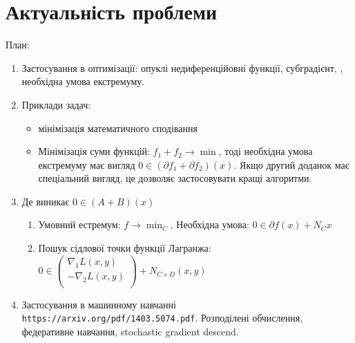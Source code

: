 \documentclass[main.tex]{subfile}
\begin{document}
	\section{Актуальність проблеми}
	 План:
	 \begin{enumerate}
	 	\item Застосування в оптимізації: опуклі недиференційовні функції, субградієнт, , необхідна умова екстремуму.
	 	\item Приклади задач:
	 	   \begin{itemize}
	 	   	\item мінімізація математичного сподівання 
	 	   	\item Мінімізація суми функцій: $f_1 + f_2 \rightarrow \min$, тоді необхідна умова екстремуму має вигляд $0 \in (\partial f_1 + \partial f_2 )(x)$. Якщо другий доданок має спеціальний вигляд, це дозволяє застосовувати кращі алгоритми.
	 	   \end{itemize} 
	 	\item Де виникає $0 \in (A + B)(x)$
	 	 \begin{enumerate} 
	 	 	\item Умовний естремум: $f \rightarrow \min_C$. Необхідна умова: $0 \in \partial f(x) + N_C x$
	 	 	\item Пошук сідлової точки функції Лагранжа: 
	 	 	      $0 \in 
	 	 	      \begin{pmatrix}
	 	 	      	\nabla_1 L(x, y) \\
	 	 	      	-\nabla_2 L(x, y) \\
	 	 	      \end{pmatrix}
 	 	          + N_{C \times D}(x, y)$
	 	 \end{enumerate}
 	 \item Застосування в машинному навчанні \texttt{https://arxiv.org/pdf/1403.5074.pdf}. Розподілені обчислення, федеративне навчання, stochastic gradient descend. 
	 \end{enumerate}
\end{document}
